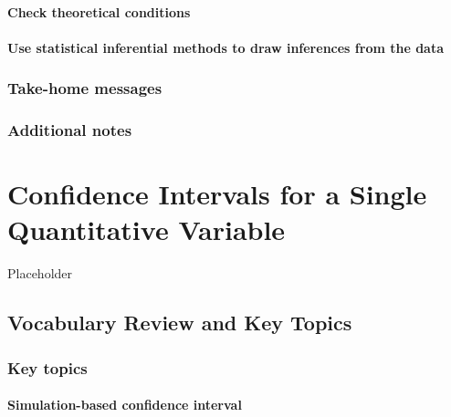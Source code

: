 \documentclass[
]{report}
\begin{document}
\subsubsection*{Check theoretical conditions}\label{check-theoretical-conditions}

\subsubsection*{Use statistical inferential methods to draw inferences from the data}\label{use-statistical-inferential-methods-to-draw-inferences-from-the-data}

\subsection{Take-home messages}\label{take-home-messages-12}

\subsection{Additional notes}\label{additional-notes-12}

\chapter{Confidence Intervals for a Single Quantitative Variable}\label{confidence-intervals-for-a-single-quantitative-variable}

Placeholder

\section{Vocabulary Review and Key Topics}\label{vocabulary-review-and-key-topics-5}

\subsection{Key topics}\label{key-topics-6}

\subsubsection*{Simulation-based confidence interval}\label{simulation-based-confidence-interval}
\end{document}
